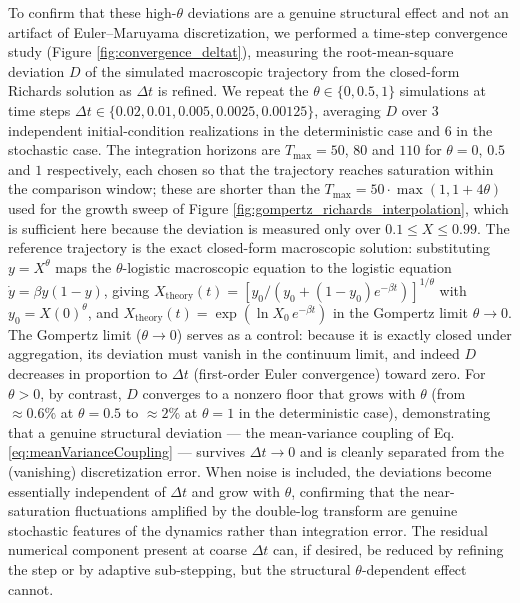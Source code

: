 \documentclass{article}
\begin{document}
To confirm that these high-$\theta$ deviations are a genuine structural effect and not an artifact of Euler--Maruyama discretization, we performed a time-step convergence study (Figure \ref{fig:convergence_deltat}), measuring the root-mean-square deviation $D$ of the simulated macroscopic trajectory from the closed-form Richards solution as $\Delta t$ is refined. We repeat the $\theta \in \{0, 0.5, 1\}$ simulations at time steps $\Delta t \in \{0.02, 0.01, 0.005, 0.0025, 0.00125\}$, averaging $D$ over $3$ independent initial-condition realizations in the deterministic case and $6$ in the stochastic case. The integration horizons are $T_{\max} = 50$, $80$ and $110$ for $\theta = 0$, $0.5$ and $1$ respectively, each chosen so that the trajectory reaches saturation within the comparison window; these are shorter than the $T_{\max} = 50 \cdot \max(1, 1 + 4\theta)$ used for the growth sweep of Figure \ref{fig:gompertz_richards_interpolation}, which is sufficient here because the deviation is measured only over $0.1 \le X \le 0.99$. The reference trajectory is the exact closed-form macroscopic solution: substituting $y = X^{\theta}$ maps the $\theta$-logistic macroscopic equation to the logistic equation $\dot{y} = \beta y(1-y)$, giving $X_{\text{theory}}(t) = \left[y_0/\left(y_0 + (1-y_0)e^{-\beta t}\right)\right]^{1/\theta}$ with $y_0 = X(0)^{\theta}$, and $X_{\text{theory}}(t) = \exp\!\left(\ln X_0 \, e^{-\beta t}\right)$ in the Gompertz limit $\theta \to 0$. The Gompertz limit ($\theta \to 0$) serves as a control: because it is exactly closed under aggregation, its deviation must vanish in the continuum limit, and indeed $D$ decreases in proportion to $\Delta t$ (first-order Euler convergence) toward zero. For $\theta > 0$, by contrast, $D$ converges to a nonzero floor that grows with $\theta$ (from $\approx 0.6\%$ at $\theta = 0.5$ to $\approx 2\%$ at $\theta = 1$ in the deterministic case), demonstrating that a genuine structural deviation — the mean-variance coupling of Eq. \ref{eq:meanVarianceCoupling} — survives $\Delta t \to 0$ and is cleanly separated from the (vanishing) discretization error. When noise is included, the deviations become essentially independent of $\Delta t$ and grow with $\theta$, confirming that the near-saturation fluctuations amplified by the double-log transform are genuine stochastic features of the dynamics rather than integration error. The residual numerical component present at coarse $\Delta t$ can, if desired, be reduced by refining the step or by adaptive sub-stepping, but the structural $\theta$-dependent effect cannot.
\end{document}

